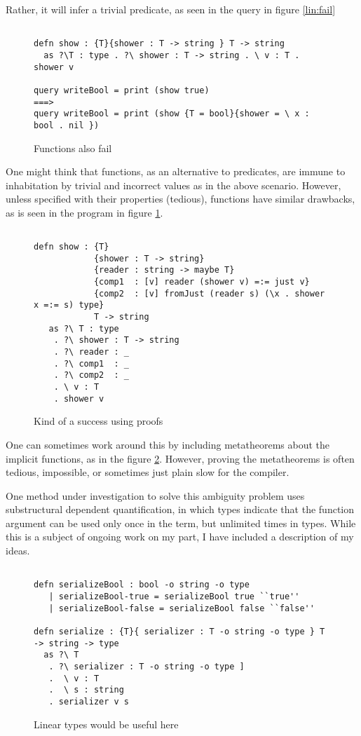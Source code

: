 Rather, it will infer a trivial predicate, as seen in the query in figure \ref{lin:fail}

\begin{figure}[H]
\begin{lstlisting}

defn show : {T}{shower : T -> string } T -> string
  as ?\T : type . ?\ shower : T -> string . \ v : T . shower v 

query writeBool = print (show true)
===>
query writeBool = print (show {T = bool}{shower = \ x : bool . nil })

\end{lstlisting}
\caption{Functions also fail}
\label{lin:ffail}
\end{figure}

One might think that functions, as an alternative to predicates, are immune to inhabitation by trivial and
incorrect values as in the above scenario. However, unless specified with their properties (tedious), 
functions have similar drawbacks, as is seen in the program in figure \ref{lin:ffail}.


\begin{figure}[H]
\begin{lstlisting}

defn show : {T}
            {shower : T -> string}
            {reader : string -> maybe T}
            {comp1  : [v] reader (shower v) =:= just v}
            {comp2  : [v] fromJust (reader s) (\x . shower x =:= s) type}
            T -> string
   as ?\ T : type
    . ?\ shower : T -> string
    . ?\ reader : _
    . ?\ comp1  : _
    . ?\ comp2  : _
    . \ v : T
    . shower v

\end{lstlisting}
\caption{Kind of a success using proofs}
\label{lin:success}
\end{figure}

One can sometimes work around this by including metatheorems about the implicit
functions, as in the figure \ref{lin:success}. However, proving the metatheorems is often tedious,
impossible, or sometimes just plain slow for the compiler.

One method under investigation to solve this ambiguity problem uses substructural dependent
quantification, in which types indicate that the function argument can  be
used only once in the term, but unlimited times in types. While
this is a subject of ongoing work on my part, I have included a description of my ideas.

\begin{figure}[H]
\begin{lstlisting}

defn serializeBool : bool -o string -o type
   | serializeBool-true = serializeBool true ``true''
   | serializeBool-false = serializeBool false ``false''

defn serialize : {T}{ serializer : T -o string -o type } T -> string -> type
  as ?\ T 
   . ?\ serializer : T -o string -o type ]
   .  \ v : T 
   .  \ s : string 
   . serializer v s

\end{lstlisting}
\caption{Linear types would be useful here}
\label{lin:linideal}
\end{figure}

